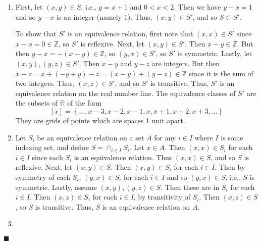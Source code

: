 \documentclass[12pt]{article}
\renewcommand{\qed}{\hfill$\blacksquare$}
\renewenvironment{proof}{\begin{addmargin}[1em]{0em}\begin{newproof}}{\end{newproof}\end{addmargin}\qed}
\begin{document}
\begin{proof}
\begin{enumerate}[label=(\alph*)]
	\item First, let $\left(x,y\right) \in S$, i.e., $y = x +1$ and $0 < x <2$. Then we have $y-x = 1$ and so $y-x$ is an integer (namely $1$). Thus, $\left(x,y\right) \in S'$, and so $S \subset S'$.
	
	To show that $S'$ is an equivalence relation, first note that $\left(x,x\right) \in S'$ since $x-x=0 \in \mathbb{Z}$, so $S'$ is reflexive. Next, let $\left(x,y\right) \in S'$. Then $x-y \in \mathbb{Z}$. But then $y-x = -\left(x-y\right) \in \mathbb{Z}$, so $\left(y,x\right) \in S'$, so $S'$ is symmetric. Lastly, let $\left(x,y\right), \left(y,z\right) \in S'$. Then $x-y$ and $y-z$ are integers. But then $x-z = x + \left(-y + y\right) - z = \left(x-y\right) + \left(y-z\right) \in \mathbb{Z}$ since it is the sum of two integers. Thus, $\left(x,z\right) \in S'$, and so $S'$ is transitive. Thus, $S'$ is an equivalence relation on the real number line. The equivalence classes of $S'$ are the subsets of $\mathbb{R}$ of the form \[ \left[x\right] = \left\{ \ldots, x-3, x-2, x-1, x, x+1, x+2, x+3, \ldots \right\} \] They are grids of points which are spaces 1 unit apart. 
	
	\item Let $S_i$ be an equivalence relation on a set $A$ for any $i\in I$ where $I$ is some indexing set, and define $S = \cap_{i \in I} S_i$. Let $x \in A$. Then $\left(x,x\right) \in S_i$ for each $i\in I$ since each $S_i$ is an equivalence relation. Thus $\left(x,x\right) \in S$, and so $S$ is reflexive. Next, let $\left(x,y\right) \in S$. Then $\left(x,y\right) \in S_i$ for each $i \in I$. Then by symmetry of each $S_i$, $\left(y,x\right) \in S_i$ for each $i \in I$ and so $\left(y,x\right) \in S$, i.e., $S$ is symmetric. Lastly, assume $\left(x,y\right),\left(y,z\right) \in S$. Then these are in $S_i$ for each $i\in I$. Then $\left(x,z\right) \in S_i$ for each $i \in I$, by transitivity of $S_i$. Then $\left(x,z\right) \in S$, so $S$ is transitive. Thus, $S$ is an equivalence relation on $A$.
	
	\item 
\end{enumerate}
\end{proof}
\end{document}
